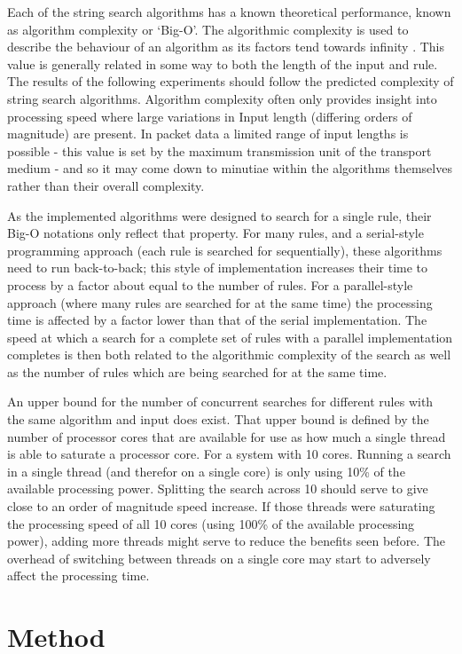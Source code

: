 \documentclass[9pt, technote]{IEEEtran}
\begin{document}
Each of the string search algorithms has a known theoretical performance, known as algorithm complexity or  `Big-O'. The algorithmic complexity is used to describe the behaviour of an algorithm as its factors tend towards infinity \citep{bachman1894, landau1909}. This value is generally related in some way to both the length of the input and rule. The results of the following experiments should follow the predicted complexity of string search algorithms. Algorithm complexity often only provides insight into processing speed where large variations in Input length (differing orders of magnitude) are present. In packet data a limited range of input lengths is possible - this value is set by the maximum transmission unit of the transport medium - and so it may come down to minutiae within the algorithms themselves rather than their overall complexity.

As the implemented algorithms were designed to search for a single rule, their Big-O notations only reflect that property. For many rules, and a serial-style programming approach (each rule is searched for sequentially), these algorithms need to run back-to-back; this style of implementation increases their time to process by a factor about equal to the number of rules. For a parallel-style approach (where many rules are searched for at the same time) the processing time is affected by a factor lower than that of the serial implementation. The speed at which a search for a complete set of rules with a parallel implementation completes is then both related to the algorithmic complexity of the search as well as the number of rules which are being searched for at the same time.

An upper bound for the number of concurrent searches for different rules with the same algorithm and input does exist. That upper bound is defined by the number of processor cores that are available for use as how much a single thread is able to saturate a processor core.
For a system with 10 cores. Running a search in a single thread (and therefor on a single core) is only using 10\% of the available processing power. Splitting the search across 10 should serve to give close to an order of magnitude speed increase. If those threads were saturating the processing speed of all 10 cores (using 100\% of the available processing power), adding more threads might serve to reduce the benefits seen before. The overhead of switching between threads on a single core may start to adversely affect the processing time.

\section{Method}
\end{document}
